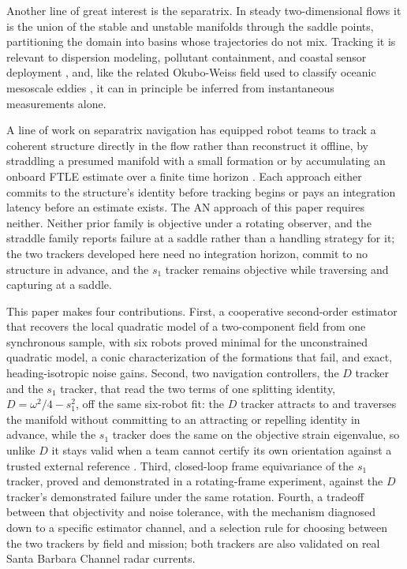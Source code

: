 \documentclass[lettersize,journal]{IEEEtran}
\begin{document}
Another line of great interest is the separatrix. In steady
two-dimensional flows it is the union of the stable and unstable
manifolds through the saddle points, partitioning the domain into
basins whose trajectories do not mix. Tracking it is relevant to
dispersion modeling, pollutant containment, and coastal sensor
deployment \cite{13,14,15}, and, like the related Okubo-Weiss field used
to classify oceanic mesoscale eddies \cite{16}, it can in principle be
inferred from instantaneous measurements alone.

A line of work on separatrix navigation has equipped robot teams to
track a coherent structure directly in the flow rather than
reconstruct it offline, by straddling a presumed manifold with a small
formation \cite{17,18,19,20} or by accumulating an onboard FTLE
estimate over a finite time horizon \cite{21}. Each approach either
commits to the structure's identity before tracking begins or pays an
integration latency before an estimate exists. The AN approach of this
paper requires neither. Neither prior family is objective under a
rotating observer, and the straddle family reports failure at a saddle
rather than a handling strategy for it; the two trackers developed here
need no integration horizon, commit to no structure in advance, and the
$s_1$ tracker remains objective while traversing and capturing at a
saddle.

This paper makes four contributions. First, a cooperative second-order
estimator that recovers the local quadratic model of a two-component
field from one synchronous sample, with six robots proved minimal for
the unconstrained quadratic model, a conic characterization of the
formations that fail, and exact, heading-isotropic noise gains. Second,
two navigation controllers, the $D$ tracker and the $s_1$ tracker, that
read the two terms of one splitting identity, $D = \omega^2/4 - s_1^2$,
off the same six-robot fit: the $D$ tracker attracts to and traverses
the manifold without committing to an attracting or repelling identity
in advance, while the $s_1$ tracker does the same on the objective
strain eigenvalue, so unlike $D$ it stays valid when a team cannot
certify its own orientation against a trusted external reference
\cite{10,22}. Third, closed-loop
frame equivariance of the $s_1$ tracker, proved and demonstrated in a
rotating-frame experiment, against the $D$ tracker's demonstrated
failure under the same rotation. Fourth, a tradeoff between that
objectivity and noise tolerance, with the mechanism diagnosed down to a
specific estimator channel, and a selection rule for choosing between
the two trackers by field and mission; both trackers are also validated
on real Santa Barbara Channel radar currents.
\end{document}
